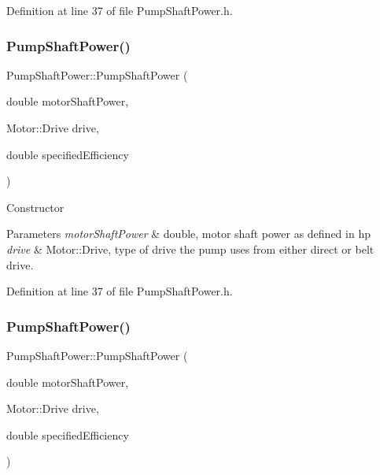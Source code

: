 Definition at line 37 of file Pump\+Shaft\+Power.\+h.

\mbox{\label{class_pump_shaft_power_a7eea468dbb3efe1f0e8ae77a2d16efe2}} 
\subsubsection{\texorpdfstring{Pump\+Shaft\+Power()}{PumpShaftPower()}\hspace{0.1cm}{\footnotesize\ttfamily [2/3]}}
{\footnotesize\ttfamily Pump\+Shaft\+Power\+::\+Pump\+Shaft\+Power (\begin{DoxyParamCaption}\item[{double}]{motor\+Shaft\+Power,  }\item[{Motor\+::\+Drive}]{drive,  }\item[{double}]{specified\+Efficiency }\end{DoxyParamCaption})\hspace{0.3cm}{\ttfamily [inline]}}

Constructor 
\begin{DoxyParams}{Parameters}
{\em motor\+Shaft\+Power} & double, motor shaft power as defined in hp \\
\hline
{\em drive} & Motor\+::\+Drive, type of drive the pump uses from either direct or belt drive. \\
\hline
\end{DoxyParams}


Definition at line 37 of file Pump\+Shaft\+Power.\+h.

\mbox{\label{class_pump_shaft_power_a7eea468dbb3efe1f0e8ae77a2d16efe2}} 
\subsubsection{\texorpdfstring{Pump\+Shaft\+Power()}{PumpShaftPower()}\hspace{0.1cm}{\footnotesize\ttfamily [3/3]}}
{\footnotesize\ttfamily Pump\+Shaft\+Power\+::\+Pump\+Shaft\+Power (\begin{DoxyParamCaption}\item[{double}]{motor\+Shaft\+Power,  }\item[{Motor\+::\+Drive}]{drive,  }\item[{double}]{specified\+Efficiency }\end{DoxyParamCaption})\hspace{0.3cm}{\ttfamily [inline]}}

